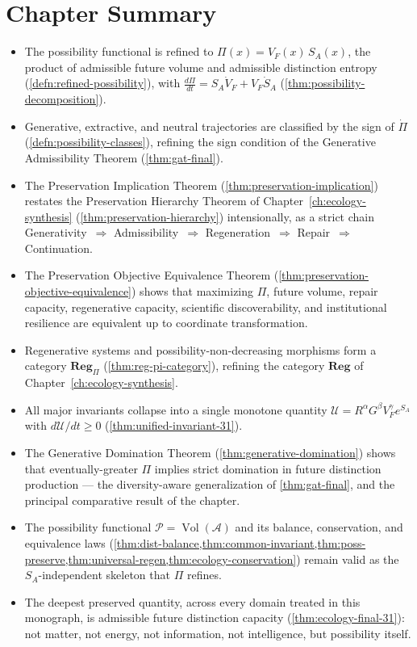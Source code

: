 \documentclass[12pt,twoside,openright]{book}
\newcommand{\adm}{\mathcal{A}}
\newcommand{\Vol}{\operatorname{Vol}}
\newenvironment{chapsummary}{%
  \begin{tcolorbox}[colback=DistBlue!5,colframe=DistBlue,
    title={\faBookOpen\enspace Summary},
    fonttitle=\sffamily\bfseries\color{white},
    attach boxed title to top left={yshift=-2mm,xshift=4mm},
    boxed title style={colback=DistBlue,rounded corners}]
  \begin{itemize}[nosep,leftmargin=*]}{%
  \end{itemize}\end{tcolorbox}}
\begin{document}
\section*{Chapter Summary}
\begin{chapsummary}
  \item The possibility functional is refined to
        $\Pi(x)=V_F(x)\,S_A(x)$, the product of admissible
        future volume and admissible distinction entropy
        (\cref{defn:refined-possibility}), with
        $\frac{d\Pi}{dt} = S_A\dot V_F + V_F \dot S_A$
        (\cref{thm:possibility-decomposition}).
  \item Generative, extractive, and neutral trajectories are
        classified by the sign of $\dot\Pi$
        (\cref{defn:possibility-classes}), refining the
        sign condition of the Generative Admissibility
        Theorem (\cref{thm:gat-final}).
  \item The Preservation Implication Theorem
        (\cref{thm:preservation-implication}) restates the
        Preservation Hierarchy Theorem of
        Chapter~\ref{ch:ecology-synthesis}
        (\cref{thm:preservation-hierarchy}) intensionally, as
        a strict chain Generativity~$\Rightarrow$
        Admissibility~$\Rightarrow$ Regeneration~$\Rightarrow$
        Repair~$\Rightarrow$ Continuation.
  \item The Preservation Objective Equivalence Theorem
        (\cref{thm:preservation-objective-equivalence}) shows that
        maximizing $\Pi$, future volume, repair capacity,
        regenerative capacity, scientific discoverability,
        and institutional resilience are equivalent up to
        coordinate transformation.
  \item Regenerative systems and possibility-non-decreasing
        morphisms form a category $\mathbf{Reg}_\Pi$
        (\cref{thm:reg-pi-category}), refining the category
        $\mathbf{Reg}$ of Chapter~\ref{ch:ecology-synthesis}.
  \item All major invariants collapse into a single monotone
        quantity $\mathcal{U}=R^\alpha G^\beta V_F^\gamma
        e^{S_A}$ with $d\mathcal{U}/dt\ge0$
        (\cref{thm:unified-invariant-31}).
  \item The Generative Domination Theorem
        (\cref{thm:generative-domination}) shows that
        eventually-greater $\Pi$ implies strict domination in
        future distinction production --- the diversity-aware
        generalization of \cref{thm:gat-final}, and the
        principal comparative result of the chapter.
  \item The possibility functional $\mathcal{P}=\Vol(\adm)$
        and its balance, conservation, and equivalence laws
        (\cref{thm:dist-balance,thm:common-invariant,thm:poss-preserve,thm:universal-regen,thm:ecology-conservation})
        remain valid as the $S_A$-independent skeleton that
        $\Pi$ refines.
  \item The deepest preserved quantity, across every domain
        treated in this monograph, is admissible future
        distinction capacity
        (\cref{thm:ecology-final-31}): not matter, not
        energy, not information, not intelligence, but
        possibility itself.
\end{chapsummary}
\end{document}
